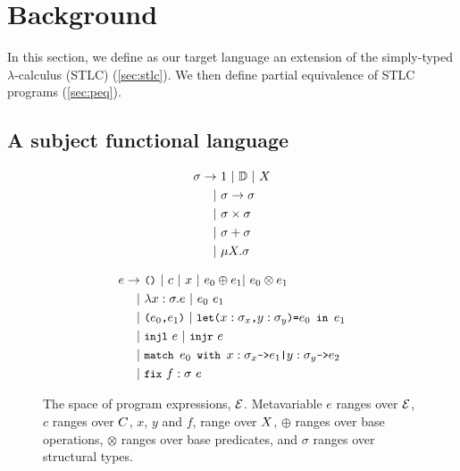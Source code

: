 \section{Background}
\label{sec:background}
%
In this section, we define as our target language an extension of the
simply-typed $\lambda$-calculus (STLC) (\autoref{sec:stlc}).
%
We then define partial equivalence of STLC programs
(\autoref{sec:peq}).

\subsection{A subject functional language}
\label{sec:stlc}
\begin{figure}[t]
  \begin{minipage}{0.36\linewidth}
    \begin{align*} %
      \sigma \rightarrow &\ \unitty\ |\ \basety\ |\ X \\
      | &\ \sigma \rightarrow \sigma \\
      | &\ \sigma \times \sigma \\
      | &\ \sigma + \sigma \\
      | &\ \mu X. \sigma
    \end{align*}
    \caption{The space of structural types, $\types$.
      Metavariable $\sigma$ ranges over $\types$ and $X$ ranges over
      least-fixed point variables.} %
    \label{fig:types}
  \end{minipage}
  \qquad
  \begin{minipage}{0.55\linewidth}
    \begin{align*}
      e \rightarrow &\ \unit\ 
                      |\ c\
                      |\ x\ 
                      |\ e_0 \oplus e_1 |\ e_0 \otimes e_1 \\
      | &\ \abs{ x }{ \sigma }{ e } \
          | \ e_0\ e_1 \\
      | &\ \pair{e_0}{e_1} \
          |\ \letexp{x}{\sigma_x }{y}{\sigma_y }{e_0}{e_1} \\
      | &\ \injl\ e\ |\ \injr\ e\ \\
      | &\ \matchexp{e_0}{x}{\sigma_x}{e_1}{y}{\sigma_y}{e_2} \\
      | &\ \fix{f}{\sigma}{e}
    \end{align*}
    \caption{The space of program expressions, $\mathcal{E}$.
      Metavariable $e$ ranges over $\mathcal{E}$, %
      $c$ ranges over $C$, %
      $x$, $y$ and $f$, range over $X$, %
      $\oplus$ ranges over base operations,
      $\otimes$ ranges over base predicates, and
      $\sigma$ ranges over structural types. } %
    \label{fig:exprs}
  \end{minipage}
  \qquad
\end{figure}


